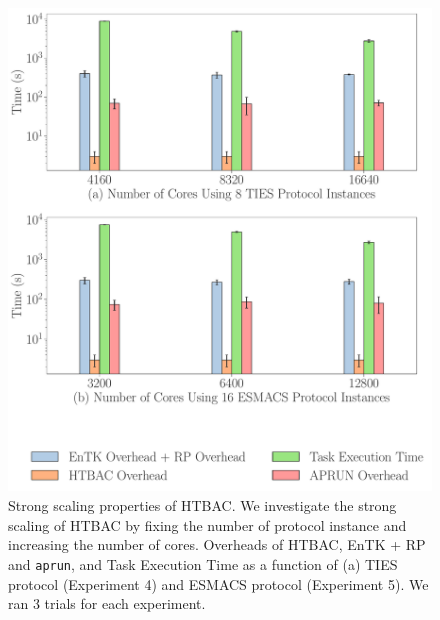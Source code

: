 \begin{figure}
  \centering
   \includegraphics[width=\columnwidth]{figures/ss_all.pdf} 
   \caption{Strong scaling properties of HTBAC. We investigate the strong
    scaling of HTBAC by fixing the number of protocol instance and increasing
    the number of cores. Overheads of HTBAC, EnTK + RP and \texttt{aprun},
    and Task Execution Time as a function of (a) TIES protocol (Experiment 4)
    and ESMACS protocol (Experiment 5). We ran 3 trials for each experiment.}
\label{fig:ss}
\end{figure}



